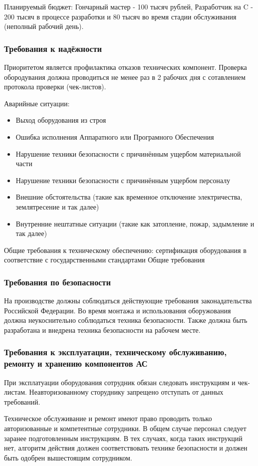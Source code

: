 \documentclass[16pt,a4paper]{article}
\begin{document}
Планируемый бюджет: Гончарный мастер - 100 тысяч рублей, Разработчик на C - 200 тысяч в процессе разработки и 80 тысяч во время стадии обслуживания (неполный рабочий день).
\subsubsection{Требования к надёжности}
Приоритетом является профилактика отказов технических компонент. Проверка обородувания должна проводиться не менее раз в 2 рабочих дня с сотавлением протокола проверки (чек-листов).

Аварийные ситуации:
\begin{itemize}
    \item Выход оборудования из строя
    \item Ошибка исполнения Аппаратного или Програмного Обеспечения
    \item Нарушение техники безопасности с причинённым ущербом материальной части
    \item Нарушение техники безопасности с причинённым ущербом персоналу
    \item Внешние обстоятельства (такие как временное отключение электричества, землятресение и так далее)
    \item Внутренние нештатные ситуации (такие как затопление, пожар, задымление и так далее)
\end{itemize}
Общие требования к техническому обеспечению: сертификация оборудования в соответствие с государственными стандартами
Общие требования
\subsubsection{Требования по безопасности}
На производстве должны соблюдаться действующие требования законадательства Российской Федерации. Во время монтажа и использования оборужования должна неукоснительно соблюдаться техника безопасности. Также должна быть разработана и внедрена техника безопасности на рабочем месте.
\subsubsection{Требования к эксплуатации, техническому обслуживанию, ремонту и хранению компонентов АС}
При эксплатуации оборудования сотрудник обязан следовать инструкциям и чек-листам. Неавторизованному сторуднику запрещено отступать от данных требований.

Техническое обслуживание и ремонт имеют право проводить только авторизованные и компетентные сотрудники. В общем случае персонал следует заранее подготовленным инструкциям. В тех случаях, когда таких инструкций нет, алгоритм действия должен соответствовать технике безопасности и должен быть одобрен вышестоящим сотрудником.
\end{document}
